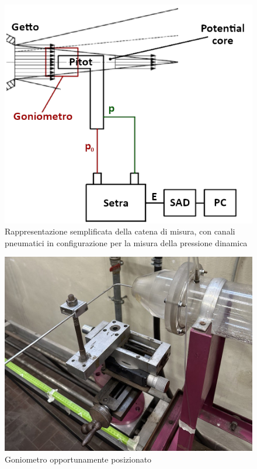 \newpage
\begin{figure}[ht]
    \centering
    \includegraphics[width=.65\textwidth]{images/2/catena.png}
    \caption{Rappresentazione semplificata della catena di misura, con canali pneumatici in configurazione per la misura della pressione dinamica}
\end{figure}
\begin{figure}[h!]
    \centering
    \includegraphics[width=.65\textwidth]{images/2/goniometro.jpg}
    \caption{Goniometro opportunamente posizionato}
\end{figure}

\newpage
